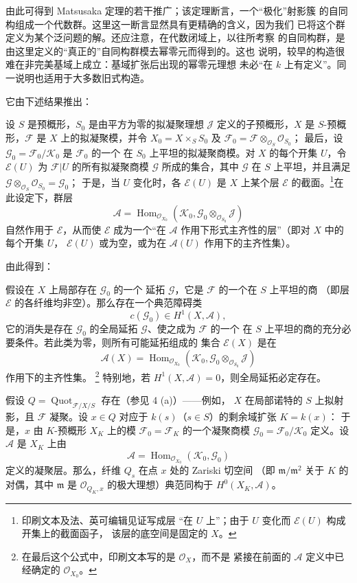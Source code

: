 由此可得到 Matsusaka 定理的若干推广；该定理断言，一个“极化”射影簇
的自同构组成一个代数群。这里这一断言显然具有更精确的含义，因为我们
已将这个群定义为某个泛问题的解。还应注意，在代数闭域上，以往所考察
的自同构群，是由这里定义的“真正的”自同构群模去幂零元而得到的。这也
说明，较早的构造很难在非完美基域上成立：基域扩张后出现的幂零元理想
未必“在 $k$ 上有定义”。同一说明也适用于大多数旧式构造。


它由下述结果推出：

 设 $S$ 是预概形，$S_0$ 是由平方为零的拟凝聚理想
$\mathcal J$ 定义的子预概形，$X$ 是 $S$-预概形，$\mathcal F$ 是
$X$ 上的拟凝聚模，并令
$X_0=X\times_SS_0$ 及
$\mathcal F_0=\mathcal F\otimes_{\mathcal O_S}\mathcal O_{S_0}$；
最后，设
$\mathcal G_0=\mathcal F_0/\mathcal K_0$ 是 $\mathcal F_0$ 的一个
在 $S_0$ 上平坦的拟凝聚商模。对 $X$ 的每个开集 $U$，令
$\mathcal E(U)$ 为 $\mathcal F|U$ 的所有拟凝聚商模 $\mathcal G$
所成的集合，其中 $\mathcal G$ 在 $S$ 上平坦，并且满足
$\mathcal G\otimes_{\mathcal O_S}\mathcal O_{S_0}=\mathcal G_0$；
于是，当 $U$ 变化时，各 $\mathcal E(U)$ 是 $X$ 上某个层
$\mathcal E$ 的截面。\footnote{印刷文本及法、英可编辑见证写成层
“在 $U$ 上”；由于 $U$ 变化而 $\mathcal E(U)$ 构成开集上的截面函子，
该层的底空间是固定的 $X$。}在此设定下，群层
\[
\mathcal A=\operatorname{Hom}_{\mathcal O_{X_0}}
(\mathcal K_0,\mathcal G_0\otimes_{\mathcal O_{S_0}}\mathcal J)
\]
自然作用于 $\mathcal E$，从而使 $\mathcal E$ 成为一个“在
$\mathcal A$ 作用下形式主齐性的层”（即对 $X$ 中的每个开集 $U$，
$\mathcal E(U)$ 或为空，或为在 $\mathcal A(U)$ 作用下的主齐性集）。

由此得到：

 假设在 $X$ 上局部存在 $\mathcal G_0$ 的一个
延拓 $\mathcal G$，它是 $\mathcal F$ 的一个在 $S$ 上平坦的商
（即层 $\mathcal E$ 的各纤维均非空）。那么存在一个典范障碍类
\[
c(\mathcal G_0)\in H^1(X,\mathcal A),
\]
它的消失是存在 $\mathcal G_0$ 的全局延拓 $\mathcal G$、使之成为 $\mathcal F$ 的一个
在 $S$ 上平坦的商的充分必要条件。若此类为零，则所有可能延拓组成的
集合 $\mathcal E(X)$ 是在
\[
\mathcal A(X)=\operatorname{Hom}_{\mathcal O_{X_0}}
(\mathcal K_0,\mathcal G_0\otimes_{\mathcal O_{S_0}}\mathcal J)
\]
作用下的主齐性集。
\footnote{在最后这个公式中，印刷文本写的是 $\mathcal O_X$，而不是
紧接在前面的 $\mathcal A$ 定义中已经确定的 $\mathcal O_{X_0}$。}
特别地，若 $H^1(X,\mathcal A)=0$，则全局延拓必定存在。

 假设
$Q=\operatorname{Quot}_{\mathcal F/X/S}$ 存在（参见 4 (a)）——例如，
$X$ 在局部诺特的 $S$ 上拟射影，且 $\mathcal F$ 凝聚。设
$x\in Q$ 对应于 $k(s)$（$s\in S$）的剩余域扩张 $K=k(x)$：
于是，$x$ 由 $K$-预概形 $X_K$ 上的模
$\mathcal F_0=\mathcal F_K$ 的一个凝聚商模
$\mathcal G_0=\mathcal F_0/\mathcal K_0$ 定义。设 $\mathcal A$ 是
$X_K$ 上由
\[
\mathcal A=\operatorname{Hom}_{\mathcal O_{X_0}}(\mathcal K_0,\mathcal G_0)
\]
定义的凝聚层。那么，纤维 $Q_s$ 在点 $x$ 处的 Zariski 切空间
（即 $\mathfrak m/\mathfrak m^2$ 关于 $K$ 的对偶，其中
$\mathfrak m$ 是 $\mathcal O_{Q_K,x}$ 的极大理想）典范同构于
$H^0(X_K,\mathcal A)$。

